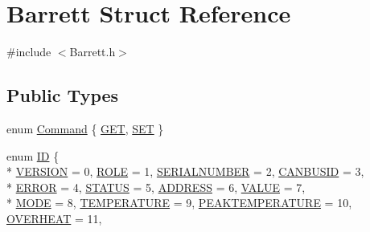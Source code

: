 \hypertarget{struct_barrett}{}\section{Barrett Struct Reference}
\label{struct_barrett}


{\ttfamily \#include $<$Barrett.\+h$>$}

\subsection*{Public Types}
\begin{DoxyCompactItemize}
\item 
enum \hyperlink{struct_barrett_abbf4a39cfafcb46bd73c64dc3c2fcd9c}{Command} \{ \hyperlink{struct_barrett_abbf4a39cfafcb46bd73c64dc3c2fcd9caf578b43d6ffa23cfd7930e2bad8781cb}{G\+E\+T}, 
\hyperlink{struct_barrett_abbf4a39cfafcb46bd73c64dc3c2fcd9ca0a2114290bcdc20151eebb58d589d351}{S\+E\+T}
 \}
\item 
enum \hyperlink{struct_barrett_a317dfaed9982ffc28166e537d774bd16}{I\+D} \{ \\*
\hyperlink{struct_barrett_a317dfaed9982ffc28166e537d774bd16a9abc12ac78518534ff22e4a43aa0ab88}{V\+E\+R\+S\+I\+O\+N} = 0, 
\hyperlink{struct_barrett_a317dfaed9982ffc28166e537d774bd16a575ff7711ff4a75e9133d58dfa8aa278}{R\+O\+L\+E} = 1, 
\hyperlink{struct_barrett_a317dfaed9982ffc28166e537d774bd16afeeec004b4aabc1504226c6ee672d1cc}{S\+E\+R\+I\+A\+L\+N\+U\+M\+B\+E\+R} = 2, 
\hyperlink{struct_barrett_a317dfaed9982ffc28166e537d774bd16a64fc31ec4c4908f8d8cf39414fff8414}{C\+A\+N\+B\+U\+S\+I\+D} = 3, 
\\*
\hyperlink{struct_barrett_a317dfaed9982ffc28166e537d774bd16a37ba75f40c6f0737071a8bfc65e28717}{E\+R\+R\+O\+R} = 4, 
\hyperlink{struct_barrett_a317dfaed9982ffc28166e537d774bd16a280784cdd7381cf1ae2f9d5b69341861}{S\+T\+A\+T\+U\+S} = 5, 
\hyperlink{struct_barrett_a317dfaed9982ffc28166e537d774bd16a76a1ef6c54cc1912fafb40a2b4fa2180}{A\+D\+D\+R\+E\+S\+S} = 6, 
\hyperlink{struct_barrett_a317dfaed9982ffc28166e537d774bd16a9f874a9daf7180dc2361e05b929d062d}{V\+A\+L\+U\+E} = 7, 
\\*
\hyperlink{struct_barrett_a317dfaed9982ffc28166e537d774bd16a324e5897910aa60f3a0bdb95cb6d554e}{M\+O\+D\+E} = 8, 
\hyperlink{struct_barrett_a317dfaed9982ffc28166e537d774bd16a662a783c4eb8483381e3bc843b385ad7}{T\+E\+M\+P\+E\+R\+A\+T\+U\+R\+E} = 9, 
\hyperlink{struct_barrett_a317dfaed9982ffc28166e537d774bd16a12b74854b9e84c2c795a970fca8638cf}{P\+E\+A\+K\+T\+E\+M\+P\+E\+R\+A\+T\+U\+R\+E} = 10, 
\hyperlink{struct_barrett_a317dfaed9982ffc28166e537d774bd16a2041fef8569eac3d04b8045914d0d73a}{O\+V\+E\+R\+H\+E\+A\+T} = 11, 

\end{DoxyCompactItemize}
